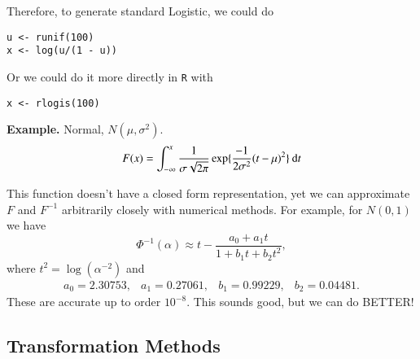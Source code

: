 \documentclass[captions=tableheading]{scrbook}
\begin{document}
\begin{itemize}
Therefore, to generate standard Logistic, we could do
\begin{verbatim}
u <- runif(100)
x <- log(u/(1 - u))
\end{verbatim}

Or we could do it more directly in \texttt{R} with
\begin{verbatim}
x <- rlogis(100)
\end{verbatim}


\textbf{Example.} Normal, \( N(\mu,\sigma^{2}) \). 
\[
F(x)=\int_{-\infty}^{x}\frac{1}{\sigma\sqrt{2\pi}}\exp\{\frac{-1}{2\sigma^{2}}(t-\mu)^{2}\}\:\mathrm{d} t
\]

This function doesn't have a closed form representation, yet we can approximate $F$ and $F^{-1}$ arbitrarily closely with numerical methods. For example, for $N(0,1)$ we have 
\[
\Phi^{-1}(\alpha)\approx t-\frac{a_{0}+a_{1}t}{1+b_{1}t+b_{2}t^{2}},
\]
where $t^{2}=\log(\alpha^{-2})$ and 
\[
\begin{array}{cccc}
a_{0}=2.30753, & a_{1}=0.27061, & b_{1}=0.99229, & b_{2}=0.04481.
\end{array}
\]
 These are accurate up to order \(10^{-8}\). This sounds good, but we can do BETTER!

\end{itemize} %
\subsection{Transformation Methods}
\label{sec-2_3_2}
\end{document}
